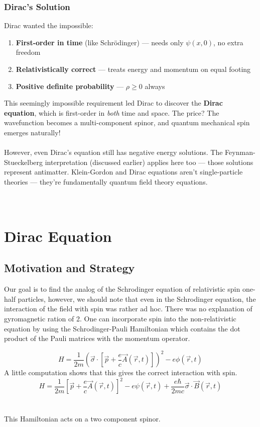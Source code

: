 \documentclass{report}
\begin{document}
\subsection{Dirac's Solution}
Dirac wanted the impossible:
\begin{enumerate}
	\item \textbf{First-order in time} (like Schr\"{o}dinger) --- needs only $\psi(x,0)$, no extra freedom
	\item \textbf{Relativistically correct} --- treats energy and momentum on equal footing
	\item \textbf{Positive definite probability} --- $\rho \geq 0$ always
\end{enumerate}
This seemingly impossible requirement led Dirac to discover the \textbf{Dirac equation}, which is first-order in \textit{both} time and space. The price? The wavefunction becomes a multi-component spinor, and quantum mechanical spin emerges naturally!\\
\\
However, even Dirac's equation still has negative energy solutions. The Feynman-Stueckelberg interpretation (discussed earlier) applies here too --- those solutions represent antimatter. Klein-Gordon and Dirac equations aren't single-particle theories --- they're fundamentally quantum field theory equations.
\\
\\
\\

\chapter{Dirac Equation}
\section{Motivation and Strategy}
Our goal is to find the analog of the Schrodinger equation of relativistic spin one-half particles, however, we should note that even in the Schrodinger equation, the interaction of the field with spin was rather ad hoc. There was no explanation of gyromagnetic ration of 2. One can incorporate spin into the non-relativistic equation by using the Schrodinger-Pauli Hamiltonian which contains the dot product of the Pauli matrices with the momentum operator.

\begin{equation}
	H = \frac{1}{2m}\left( \vec{\sigma} \cdot \left[ \vec{p} + \frac{e}{c} \vec{A} \left( \vec{r}, t \right)  \right]  \right)^2 - e \phi \left( \vec{r}, t \right)
\end{equation}
A little computation shows that this gives the correct interaction with spin.
\begin{equation}
	H = \frac{1}{2m} \left[ \vec{p} + \frac{e}{c} \vec{A} \left( \vec{r}, t \right)  \right]^2 - e \psi \left( \vec{r},t \right) + \frac{e \hbar}{2mc} \vec{\sigma} \cdot \vec{B} \left( \vec{r},t \right)
\end{equation}\\ \\
This Hamiltonian acts on a two component spinor.\\ \\
\end{document}
